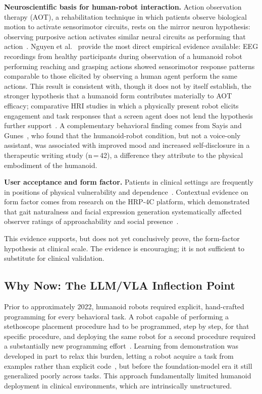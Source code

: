 \textbf{Neuroscientific basis for human-robot interaction.} Action observation
therapy (AOT), a rehabilitation technique in which patients observe biological
motion to activate sensorimotor circuits, rests on the mirror neuron hypothesis:
observing purposive action activates similar neural circuits as performing that
action~\cite{rizzolatti2004mirror}. Nguyen et al.~\cite{nguyen2024eeg} provide the most direct empirical
evidence available: EEG recordings from healthy participants during observation of
a humanoid robot performing reaching and grasping actions showed sensorimotor
response patterns comparable to those elicited by observing a human agent perform
the same actions. This result is consistent with, though it does not by itself
establish, the stronger hypothesis that a humanoid form contributes materially to
AOT efficacy; comparative HRI studies in which a physically present robot elicits
engagement and task responses that a screen agent does not lend the hypothesis
further support~\cite{bainbridge2011benefits,li2015benefit}.
A complementary behavioral finding comes from Sayis and
Gunes~\cite{sayis2024technology}, who found that the humanoid-robot condition,
but not a voice-only assistant, was associated with improved mood and increased
self-disclosure in a therapeutic writing study (n\,=\,42), a difference they
attribute to the physical embodiment of the humanoid.

\textbf{User acceptance and form factor.} Patients in clinical settings
are frequently in positions of physical vulnerability and
dependence~\cite{gallagher2008dignity,fuseini2022dignity}.
Contextual evidence on form factor comes from research on the HRP-4C platform,
which demonstrated that gait naturalness and facial expression generation
systematically affected observer ratings of approachability and social
presence~\cite{cao2025humanoid}.

This evidence supports, but does not yet conclusively prove, the
form-factor hypothesis at clinical scale. The evidence is encouraging; it is not
sufficient to substitute for clinical validation.

\subsection{Why Now: The LLM/VLA Inflection Point}
\label{sec:llm}

Prior to approximately 2022, humanoid robots required explicit, hand-crafted
programming for every behavioral task.
A robot capable of performing a
stethoscope placement procedure had to be programmed, step by step, for that
specific procedure, and deploying the same robot for a second procedure required
a substantially new programming effort~\cite{billard2008robot,schaal1999imitation}.
Learning from demonstration was developed in part to relax this burden, letting a
robot acquire a task from examples rather than explicit
code~\cite{argall2009survey,ravichandar2020recent}, but before the foundation-model
era it still generalized poorly across tasks. This approach fundamentally limited
humanoid deployment in clinical environments, which are intrinsically
unstructured.

